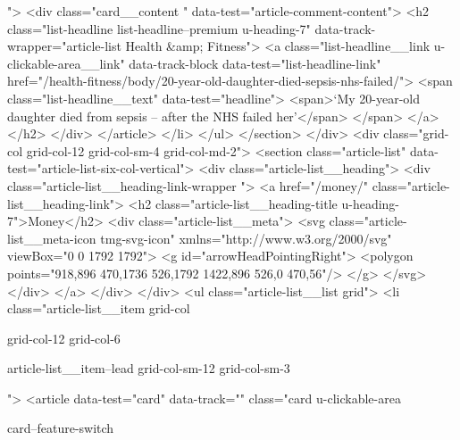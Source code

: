 {{{			
			
			 ">
<div class="card__content " data-test="article-comment-content">
<h2 class="list-headline list-headline--premium u-heading-7" data-track-wrapper="article-list Health &amp; Fitness">
<a class="list-headline__link u-clickable-area__link" data-track-block data-test="list-headline-link" href="/health-fitness/body/20-year-old-daughter-died-sepsis-nhs-failed/">
<span class="list-headline__text" data-test="headline">
<span>‘My 20-year-old daughter died from sepsis – after the NHS failed her’</span>
</span>
</a>
</h2>
</div>
</article>
</li>
</ul>
</section>
</div>
<div class="grid-col grid-col-12 grid-col-sm-4 grid-col-md-2">
<section class="article-list" data-test="article-list-six-col-vertical">
<div class="article-list__heading">
<div class="article-list__heading-link-wrapper
				">
<a href="/money/" class="article-list__heading-link">
<h2 class="article-list__heading-title u-heading-7">Money</h2>
<div class="article-list__meta">
<svg class="article-list__meta-icon  tmg-svg-icon" xmlns="http://www.w3.org/2000/svg" viewBox="0 0 1792 1792">
<g id="arrowHeadPointingRight">
<polygon points="918,896 470,1736 526,1792 1422,896 526,0 470,56"/>
</g>
</svg>
</div>
</a>
</div>
</div>
<ul class="article-list__list grid">
<li class="article-list__item
				grid-col
				
				
				
				grid-col-12
				grid-col-6
				
				
				
				
				article-list__item--lead grid-col-sm-12
				grid-col-sm-3
				
				
				">
<article data-test="card" data-track="" class="card
			u-clickable-area
			
			card--feature-switch
			
			
			
			
			
}}}
